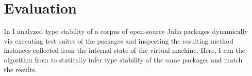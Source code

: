 

\section{Evaluation}%
\label{sec:approx:eval}

In  I analyzed type stability of a corpus of open-source
Julia packages dynamically via executing test suites of the packages and
inspecting the resulting method instances collected from the internal state of
the virtual machine. Here, I run the algorithm from  to
statically infer type stability of the same packages and match the
results.
